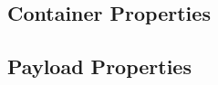 \subsection{Container Properties}%
\label{sec:ContainerProperties}%


\subsection{Payload Properties}%
\label{sec:PayloadProperties}%


%
%
